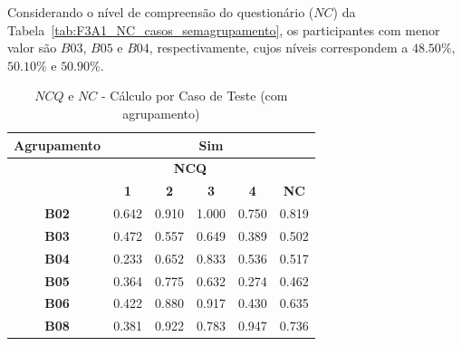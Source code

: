 Considerando o nível de compreensão do questionário ($NC$) da Tabela~\ref{tab:F3A1_NC_casos_semagrupamento}, os participantes com menor valor são $B03$, $B05$ e $B04$, respectivamente, cujos níveis correspondem a $48.50\%$, $50.10\%$ e $50.90\%$.

\begin{table}[htbp]
	\centering
	\caption{$NCQ$ e $NC$ - Cálculo por Caso de Teste (com agrupamento)}
	\begin{tabular}{|c|lllll|}
		\hline
		\cellcolor[HTML]{F2F2F2}\textbf{Agrupamento} & \multicolumn{5}{c|}{Sim} \\ \hline
		\rowcolor[HTML]{D0CECE} 
		\cellcolor[HTML]{D0CECE} & \multicolumn{4}{c|}{\cellcolor[HTML]{D0CECE}\textbf{NCQ}} & \multicolumn{1}{c|}{\cellcolor[HTML]{D0CECE}} \\ \cline{2-5}
		\rowcolor[HTML]{D0CECE} 
		\multirow{-2}{*}{\cellcolor[HTML]{D0CECE}\textbf{Participante}} & \multicolumn{1}{c|}{\cellcolor[HTML]{D0CECE}\textbf{1}} & \multicolumn{1}{c|}{\cellcolor[HTML]{D0CECE}\textbf{2}} & \multicolumn{1}{c|}{\cellcolor[HTML]{D0CECE}\textbf{3}} & \multicolumn{1}{c|}{\cellcolor[HTML]{D0CECE}\textbf{4}} & \multicolumn{1}{c|}{\multirow{-2}{*}{\cellcolor[HTML]{D0CECE}\textbf{NC}}} \\ \hline
		\textbf{B02} & \multicolumn{1}{l|}{0.642} & \multicolumn{1}{l|}{0.910} & \multicolumn{1}{l|}{1.000} & \multicolumn{1}{l|}{0.750} & 0.819 \\ \hline
		\rowcolor[HTML]{F2F2F2} 
		\textbf{B03} & \multicolumn{1}{l|}{\cellcolor[HTML]{F2F2F2}0.472} & \multicolumn{1}{l|}{\cellcolor[HTML]{F2F2F2}0.557} & \multicolumn{1}{l|}{\cellcolor[HTML]{F2F2F2}0.649} & \multicolumn{1}{l|}{\cellcolor[HTML]{F2F2F2}0.389} & 0.502 \\ \hline
		\textbf{B04} & \multicolumn{1}{l|}{0.233} & \multicolumn{1}{l|}{0.652} & \multicolumn{1}{l|}{0.833} & \multicolumn{1}{l|}{0.536} & 0.517 \\ \hline
		\rowcolor[HTML]{F2F2F2} 
		\textbf{B05} & \multicolumn{1}{l|}{\cellcolor[HTML]{F2F2F2}0.364} & \multicolumn{1}{l|}{\cellcolor[HTML]{F2F2F2}0.775} & \multicolumn{1}{l|}{\cellcolor[HTML]{F2F2F2}0.632} & \multicolumn{1}{l|}{\cellcolor[HTML]{F2F2F2}0.274} & 0.462 \\ \hline
		\textbf{B06} & \multicolumn{1}{l|}{0.422} & \multicolumn{1}{l|}{0.880} & \multicolumn{1}{l|}{0.917} & \multicolumn{1}{l|}{0.430} & 0.635 \\ \hline
		\rowcolor[HTML]{F2F2F2} 
		\textbf{B08} & \multicolumn{1}{l|}{\cellcolor[HTML]{F2F2F2}0.381} & \multicolumn{1}{l|}{\cellcolor[HTML]{F2F2F2}0.922} & \multicolumn{1}{l|}{\cellcolor[HTML]{F2F2F2}0.783} & \multicolumn{1}{l|}{\cellcolor[HTML]{F2F2F2}0.947} & 0.736 \\ \hline

\end{tabular}
\end{table}
